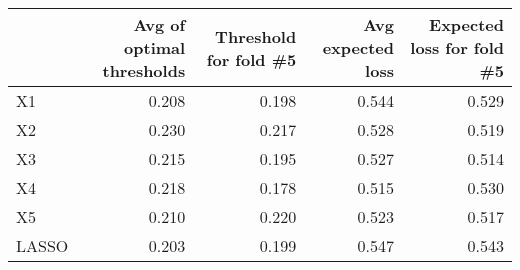 
\begin{tabular}{lrrrr}
\toprule
  & Avg of optimal thresholds & Threshold for fold \#5 & Avg expected loss & Expected loss for fold \#5\\
\midrule
X1 & 0.208 & 0.198 & 0.544 & 0.529\\
X2 & 0.230 & 0.217 & 0.528 & 0.519\\
X3 & 0.215 & 0.195 & 0.527 & 0.514\\
X4 & 0.218 & 0.178 & 0.515 & 0.530\\
X5 & 0.210 & 0.220 & 0.523 & 0.517\\
LASSO & 0.203 & 0.199 & 0.547 & 0.543\\
\bottomrule
\end{tabular}